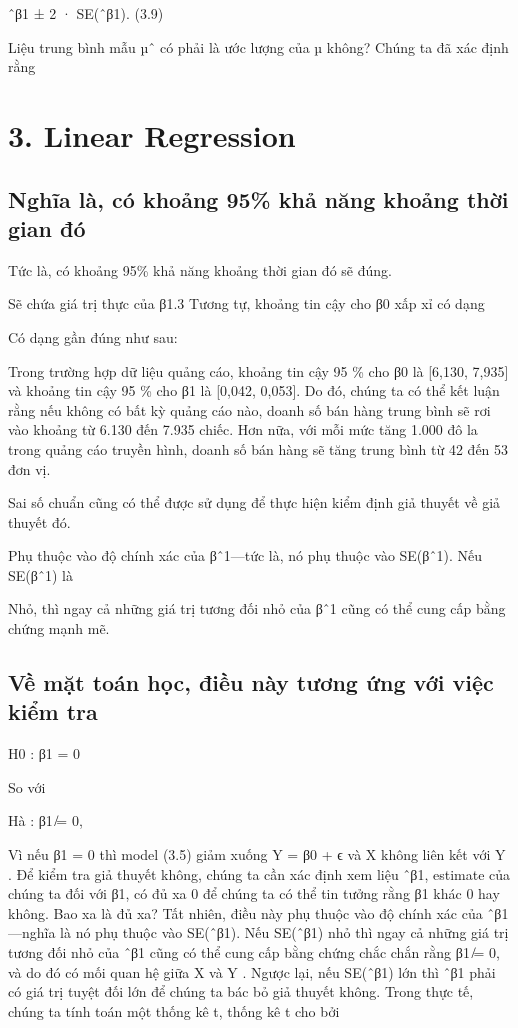 ˆβ1 ± 2 · SE(ˆβ1). (3.9)

Liệu trung bình mẫu µˆ có phải là ước lượng của µ không? Chúng ta đã xác định rằng

\section{3. Linear Regression}

\subsection{Nghĩa là, có khoảng 95\% khả năng khoảng thời gian đó}

Tức là, có khoảng 95\% khả năng khoảng thời gian đó sẽ đúng.

Sẽ chứa giá trị thực của β1.3 Tương tự, khoảng tin cậy cho β0 xấp xỉ có dạng

Có dạng gần đúng như sau:

Trong trường hợp dữ liệu quảng cáo, khoảng tin cậy 95 \% cho β0 là [6,130, 7,935] và khoảng tin cậy 95 \% cho β1 là [0,042, 0,053]. Do đó, chúng ta có thể kết luận rằng nếu không có bất kỳ quảng cáo nào, doanh số bán hàng trung bình sẽ rơi vào khoảng từ 6.130 đến 7.935 chiếc. Hơn nữa, với mỗi mức tăng 1.000 đô la trong quảng cáo truyền hình, doanh số bán hàng sẽ tăng trung bình từ 42 đến 53 đơn vị.

Sai số chuẩn cũng có thể được sử dụng để thực hiện kiểm định giả thuyết về giả thuyết đó.

Phụ thuộc vào độ chính xác của βˆ1—tức là, nó phụ thuộc vào SE(βˆ1). Nếu SE(βˆ1) là

Nhỏ, thì ngay cả những giá trị tương đối nhỏ của βˆ1 cũng có thể cung cấp bằng chứng mạnh mẽ.

\subsection{Về mặt toán học, điều này tương ứng với việc kiểm tra}

H0 : β1 = 0

So với

Hà : β1 ̸= 0,

Vì nếu β1 = 0 thì model (3.5) giảm xuống Y = β0 + ϵ và X không liên kết với Y . Để kiểm tra giả thuyết không, chúng ta cần xác định xem liệu ˆβ1, estimate của chúng ta đối với β1, có đủ xa 0 để chúng ta có thể tin tưởng rằng β1 khác 0 hay không. Bao xa là đủ xa? Tất nhiên, điều này phụ thuộc vào độ chính xác của ˆβ1—nghĩa là nó phụ thuộc vào SE(ˆβ1). Nếu SE(ˆβ1) nhỏ thì ngay cả những giá trị tương đối nhỏ của ˆβ1 cũng có thể cung cấp bằng chứng chắc chắn rằng β1 ̸= 0, và do đó có mối quan hệ giữa X và Y . Ngược lại, nếu SE(ˆβ1) lớn thì ˆβ1 phải có giá trị tuyệt đối lớn để chúng ta bác bỏ giả thuyết không. Trong thực tế, chúng ta tính toán một thống kê t, thống kê t cho bởi

